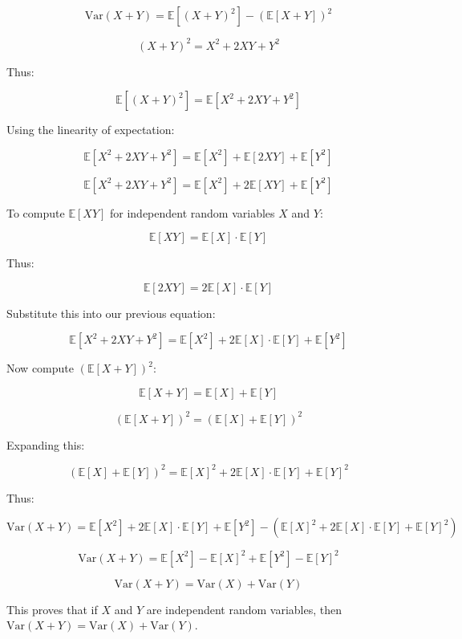 \documentclass[letter]{article}
\theoremstyle{definition}
\newcommand{\Var}{\mathrm{Var}}
\newenvironment{soln}{
	\leavevmode\color{black}\ignorespaces
}{}
\begin{document}
\begin{enumerate}
		\begin{soln}
			\[
			\Var(X + Y) = \mathbb{E}[(X + Y)^2] - (\mathbb{E}[X + Y])^2
			\]
			
			
			
			\[
			(X + Y)^2 = X^2 + 2XY + Y^2
			\]
			
			Thus:
			
			\[
			\mathbb{E}[(X + Y)^2] = \mathbb{E}[X^2 + 2XY + Y^2]
			\]
			
			Using the linearity of expectation:
			
			\[
			\mathbb{E}[X^2 + 2XY + Y^2] = \mathbb{E}[X^2] + \mathbb{E}[2XY] + \mathbb{E}[Y^2]
			\]
			
			\[
			\mathbb{E}[X^2 + 2XY + Y^2] = \mathbb{E}[X^2] + 2 \mathbb{E}[XY] + \mathbb{E}[Y^2]
			\]
			
			To compute \(\mathbb{E}[XY]\) for independent random variables \(X\) and \(Y\):
			
			\[
			\mathbb{E}[XY] = \mathbb{E}[X] \cdot \mathbb{E}[Y]
			\]
			
			Thus:
			
			\[
			\mathbb{E}[2XY] = 2 \mathbb{E}[X] \cdot \mathbb{E}[Y]
			\]
			
			Substitute this into our previous equation:
			
			\[
			\mathbb{E}[X^2 + 2XY + Y^2] = \mathbb{E}[X^2] + 2 \mathbb{E}[X] \cdot \mathbb{E}[Y] + \mathbb{E}[Y^2]
			\]
			
			Now compute \((\mathbb{E}[X + Y])^2\):
			
			\[
			\mathbb{E}[X + Y] = \mathbb{E}[X] + \mathbb{E}[Y]
			\]
			
			\[
			(\mathbb{E}[X + Y])^2 = (\mathbb{E}[X] + \mathbb{E}[Y])^2
			\]
			
			Expanding this:
			
			\[
			(\mathbb{E}[X] + \mathbb{E}[Y])^2 = \mathbb{E}[X]^2 + 2 \mathbb{E}[X] \cdot \mathbb{E}[Y] + \mathbb{E}[Y]^2
			\]
			
			Thus:
			
			\[
			\Var(X + Y) = \mathbb{E}[X^2] + 2 \mathbb{E}[X] \cdot \mathbb{E}[Y] + \mathbb{E}[Y^2] - (\mathbb{E}[X]^2 + 2 \mathbb{E}[X] \cdot \mathbb{E}[Y] + \mathbb{E}[Y]^2)
			\]
			
			\[
			\Var(X + Y) = \mathbb{E}[X^2] - \mathbb{E}[X]^2 + \mathbb{E}[Y^2] - \mathbb{E}[Y]^2
			\]
			
			\[
			\Var(X + Y) = \Var(X) + \Var(Y)
			\]
			
			This proves that if \(X\) and \(Y\) are independent random variables, then \(\Var(X + Y) = \Var(X) + \Var(Y)\).
		\end{soln}
		

\end{enumerate}
\end{document}

